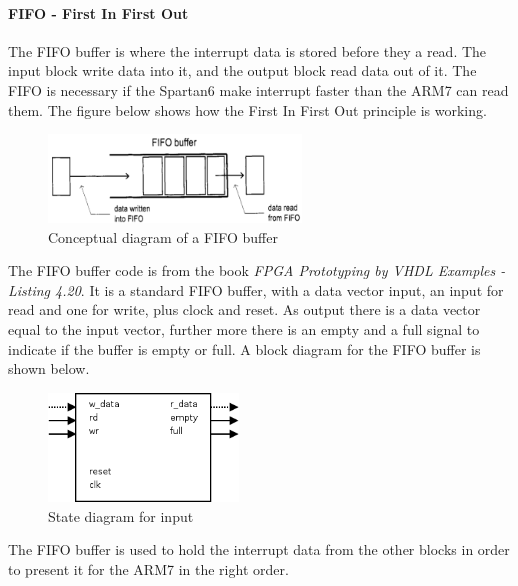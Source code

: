 \paragraph{FIFO - First In First Out}
The FIFO buffer is where the interrupt data is stored before they a read. The input block write data into it, and the output block read data out of it. The FIFO is necessary if the Spartan6 make interrupt faster than the ARM7 can read them. The figure below shows how the First In First Out principle is working.
\begin{figure}[H]
	\begin{centering}
		\includegraphics[width=0.6\textwidth]{images/tb5_fifo.png}
		\caption{Conceptual diagram of a FIFO buffer}
	\end{centering}
\end{figure}
The FIFO buffer code is from the book \textit{FPGA Prototyping by VHDL Examples - Listing 4.20}. It is a standard FIFO buffer, with a data vector input, an input for read and one for write, plus clock and reset. As output there is a data vector equal to the input vector, further more there is an empty and a full signal to indicate if the buffer is empty or full. A block diagram for the FIFO buffer is shown below.
\begin{figure}[H]
	\begin{centering}
		\includegraphics[width=0.45\textwidth]{images/tb5_fifo_block.png}
		\caption{State diagram for input}
	\end{centering}
\end{figure}
The FIFO buffer is used to hold the interrupt data from the other blocks in order to present it for the ARM7 in the right order.
